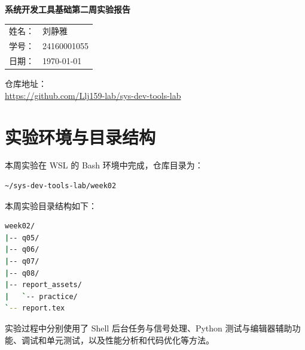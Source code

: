 \documentclass[UTF8,a4paper,12pt]{ctexart}
\begin{document}
\begin{titlepage}
    \thispagestyle{empty}

    \vspace*{2.6cm}

    \begin{center}
        {\LARGE\bfseries 系统开发工具基础第二周实验报告\par}
    \end{center}

    \vspace{4.2cm}

    \begin{center}
        \begin{tabular}{rl}
            姓名： & 刘静雅 \\
            学号： & 24160001055 \\
            日期： & \today
        \end{tabular}
    \end{center}

    \vspace{1.5cm}

    \begin{center}
        仓库地址：\\
        \url{https://github.com/Llj159-lab/sys-dev-tools-lab}
    \end{center}
\end{titlepage}


\tableofcontents

\newpage

\section{实验环境与目录结构}

本周实验在 WSL 的 Bash 环境中完成，仓库目录为：

\begin{lstlisting}[language=bash]
~/sys-dev-tools-lab/week02
\end{lstlisting}

本周实验目录结构如下：

\begin{lstlisting}[language=bash]
week02/
|-- q05/
|-- q06/
|-- q07/
|-- q08/
|-- report_assets/
|   `-- practice/
`-- report.tex
\end{lstlisting}

实验过程中分别使用了 Shell 后台任务与信号处理、Python 测试与编辑器辅助功能、调试和单元测试，以及性能分析和代码优化等方法。
\end{document}
